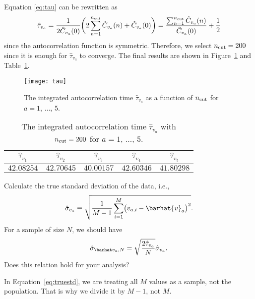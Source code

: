 \Answer{}
Equation \eqref{eq:tau} can be rewritten as
%
\begin{equation}
    \hat{\tau}_{v_a} = \frac{ 1 }{ 2 \hat{C}_{v_a}(0) }
    \biggl( 2\sum_{n=1}^{n_\textnormal{cut}} \hat{C}_{v_a}(n) + \hat{C}_{v_a}(0) \biggr)
    = \frac{ \sum_{n=1}^{n_\textnormal{cut}} \hat{C}_{v_a}(n) }{ \hat{C}_{v_a}(0) }
    + \frac{ 1 }{ 2 }
\end{equation}
%
since the autocorrelation function is symmetric.
Therefore, we select \(n_\textnormal{cut} = 200\) since it is enough for \(\hat{\tau}_{v_a}\)
to converge.
The final results are shown in Figure~\ref{fig:tau} and Table~\ref{tab:tau}.

\begin{figure}[h]
    \centering
    \texttt{[image: tau]}
    \caption{The integrated autocorrelation time \(\hat{\tau}_{v_a}\) as a
        function of \(n_\textnormal{cut}\) for \(a = 1\), \(\ldots\), \(5\).}
    \label{fig:tau}
\end{figure}

\begin{table}
    \centering
    \caption{The integrated autocorrelation time \(\hat{\tau}_{v_a}\) with
        \(n_\textnormal{cut} = 200\) for \(a = 1\), \(\ldots\), \(5\).}
    \label{tab:tau}
    \begin{tabular}{@{}ccccc@{}}
        \toprule
        \(\hat{\tau}_{v_1}\) & \(\hat{\tau}_{v_2}\) & \(\hat{\tau}_{v_3}\) & \(\hat{\tau}_{v_4}\) & \(\hat{\tau}_{v_5}\) \\
        \midrule
        \(42.08254\)         & \(42.70645\)         & \(40.00157\)         & \(42.60346\)         & \(41.80298\)         \\
        \bottomrule
    \end{tabular}
\end{table}

\Question{} Calculate the true standard deviation of the data, i.e.,
%
\begin{equation}\label{eq:truestd}
    \hat{\sigma}_{v_a} \equiv \sqrt{\frac{ 1 }{ M - 1 }
        \sum_{i=1}^M \bigl( v_{a,i} - \barhat{v}_a \bigr)^2}.
\end{equation}
%
For a sample of size \(N\), we should have
%
\begin{equation}\label{eq:relation}
    \sgbar{a} = \sqrt{\frac{ 2 \hat{\tau}_{v_a} }{ N }} \hat{\sigma}_{v_a}.
\end{equation}
%
Does this relation hold for your analysis?

\Answer{}
In Equation~\eqref{eq:truestd}, we are treating all \(M\) values as a sample,
not the population.
That is why we divide it by \(M - 1\), not \(M\).

